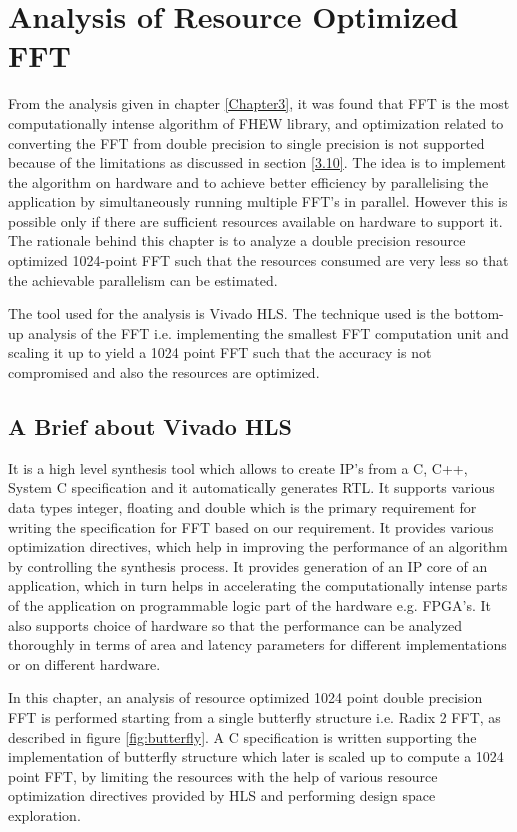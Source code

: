 \chapter{Analysis of Resource Optimized FFT}\label{Chapter4}
From the analysis given in chapter \ref{Chapter3}, it was found that FFT is the most computationally intense algorithm of FHEW library, and optimization related to converting the FFT from double precision to single precision is not supported  because of the limitations as discussed in section \ref{3.10}. The idea is to implement the algorithm on hardware and to achieve better efficiency by parallelising the application by simultaneously running multiple FFT's in parallel. However this is possible only if there are sufficient resources available on hardware to support it. The rationale behind this chapter is to analyze a double precision resource optimized 1024-point FFT such that the resources consumed are very less so that the achievable parallelism can be estimated.

\noindent The tool used for the analysis is Vivado HLS. The technique used is the bottom-up analysis of the FFT i.e. implementing the smallest FFT computation unit and scaling it up to yield a 1024 point FFT such that the accuracy is not compromised and also the resources are optimized. 
\section{A Brief about Vivado HLS}
It is a high level synthesis tool which allows to create IP's from a C, C++, System C specification and it automatically generates RTL. It supports various data types integer, floating and double which is the primary requirement for writing the specification for FFT based on our requirement. It provides various optimization directives, which help in improving the performance of an algorithm by controlling the synthesis process. It provides generation of an IP core of an application, which in turn helps in accelerating the computationally intense parts of the application on programmable logic part of the hardware e.g. FPGA's. It also supports choice of hardware so that the performance can be analyzed thoroughly in terms of area and latency parameters for different implementations or on different hardware. 

In this chapter, an analysis of resource optimized 1024 point double precision FFT is performed starting from a single butterfly structure i.e. Radix 2 FFT, as described in figure \ref{fig:butterfly}. A C specification is written supporting the implementation of butterfly structure which later is scaled up to compute a 1024 point FFT, by limiting the resources with the help of various resource optimization directives provided by HLS and performing design space exploration.


